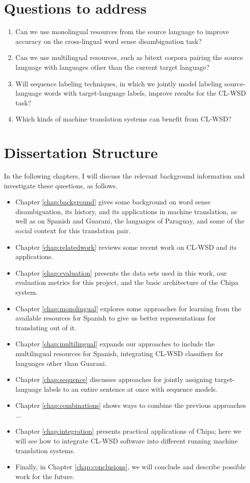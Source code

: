 \section{Questions to address}
\begin{enumerate}
\item Can we use monolingual resources from the source language to improve
accuracy on the cross-lingual word sense disambiguation task?
\item Can we use multilingual resources, such as bitext corpora pairing the
source language with languages other than the current target language?
\item Will sequence labeling techniques, in which we jointly model labeling
source-language words with target-language labels, improve results for the
CL-WSD task?
\item Which kinds of machine translation systems can benefit from CL-WSD?
\end{enumerate}

\section{Dissertation Structure}
In the following chapters, I will discuss the relevant background information
and investigate these questions, as follows.

\begin{itemize}
\item Chapter \ref{chap:background} gives some background on word sense
disambiguation, its history, and its applications in machine translation, as
well as on Spanish and Guarani, the languages of Paraguay, and some of the
social context for this translation pair.
\item Chapter \ref{chap:relatedwork} reviews some recent work on CL-WSD and its
applications.
\item Chapter \ref{chap:evaluation} presents the data sets used in this work,
our evaluation metrics for this project, and the basic architecture of the
Chipa system.
\item Chapter \ref{chap:monolingual} explores some approaches for learning from
the available resources for Spanish to give us better representations for
translating out of it.
\item Chapter \ref{chap:multilingual} expands our approaches to include the
multilingual resources for Spanish, integrating CL-WSD classifiers for
languages other than Guarani.
\item Chapter \ref{chap:sequence} discusses approaches for jointly assigning
target-language labels to an entire sentence at once with sequence models.
\item Chapter \ref{chap:combinations} shows ways to combine the previous
approaches ... %
\item Chapter \ref{chap:integration} presents practical applications of Chipa;
here we will see how to integrate CL-WSD software into different running
machine translation systems.
\item Finally, in Chapter \ref{chap:conclusions}, we will conclude and describe
possible work for the future.
\end{itemize}

